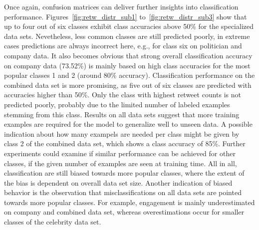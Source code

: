 Once again, confusion matrices can deliver further insights into classification
performance.
Figures~\ref{fig:retw_distr_sub1} to~\ref{fig:retw_distr_sub3} show that up to
four out of six classes exhibit class accuracies above 50\% for the specialized
data sets.
Nevetheless, less common classes are still predicted poorly, in extreme cases
predictions are always incorrect here, e.g., for class six on politician and
company data.
It also becomes obvious that strong overall classification accuracy on company data
(73.52\%) is mainly based on high class accuracies for the most popular classes
1 and 2 (around 80\% accuracy).
Classification performance on the combined data set is more promising, as five
out of six classes are predicted with accuracies higher than 50\%.
Only the class with highest retweet counts is not predicted poorly, probably due
to the limited number of labeled examples stemming from this class.
Results on all data sets suggest that more training examples are
required for the model to generalize well to unseen data.
A possible indication about how many exampels are needed per class might be
given by class 2 of the combined data set, which shows a class accuracy of 85\%.
Further experiments could examine if similar performance can be achieved for
other classes, if the given number of examples are seen at training time.
All in all, classification are still biased towards more popular classes, where
the extent of the bias is dependent on overall data set size.
Another indication of biased behavior is the observation that misclassifications
on all data sets are pointed towards more popular classes.
For example, engagement is mainly underestimated on company and combined data set,
whereas overestimations occur for smaller classes of the celebrity data set.

